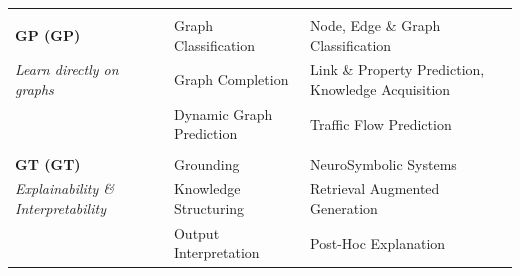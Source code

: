 \begin{landscape}
\begin{table}[t]
\begin{center}
{\begin{tabular}{lll}
                & & \\
                \textbf{\acl{GP} (\acs{GP})}           & Graph Classification     & Node, Edge \& Graph Classification\\
                \textit{Learn directly on graphs}~\cite{Cen2023,Baruah2021,Wu2020,Blagec2022}   & Graph Completion         & Link \& Property Prediction, Knowledge Acquisition \\
                                                    & Dynamic Graph Prediction & Traffic Flow Prediction\\
                & & \\
                \textbf{\acl{GT} (\acs{GT})}  & Grounding & NeuroSymbolic Systems \\
                \textit{Explainability \& Interpretability}~\cite{Yuan2020,Pfeifer2022,Lenat2023,Yu2022,Zhao2024,Pan2024,Hendrycks2021,Tiddi2020,Tiddi2022,Sheth2023} & Knowledge Structuring & Retrieval Augmented Generation \\
                                                              & Output Interpretation & Post-Hoc Explanation\\%


\end{tabular}}
\end{center}
\end{table}
\end{landscape}
